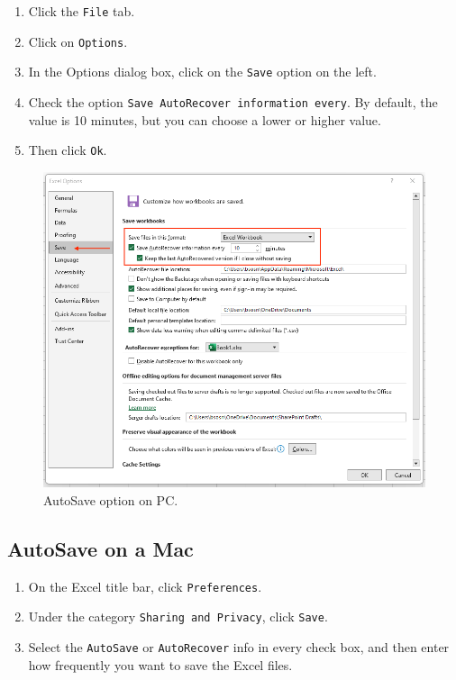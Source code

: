\documentclass[
]{book}
\providecommand{\tightlist}{%
  \setlength{\itemsep}{0pt}\setlength{\parskip}{0pt}}
\begin{document}
\begin{enumerate}
\def\labelenumi{\arabic{enumi}.}
\tightlist
\item
  Click the \texttt{File} tab.
\item
  Click on \texttt{Options}.
\item
  In the Options dialog box, click on the \texttt{Save} option on the left.
\item
  Check the option \texttt{Save\ AutoRecover\ information\ every}. By default, the value is 10 minutes, but you can choose a lower or higher value.
\item
  Then click \texttt{Ok}.
\end{enumerate}

\begin{figure}

{\centering \includegraphics[width=0.85\linewidth]{autosave-pc} 

}

\caption{AutoSave option on PC.}\label{fig:autosave-pc}
\end{figure}

\hypertarget{autosave-on-a-mac}{%
\subsection{AutoSave on a Mac}\label{autosave-on-a-mac}}

\begin{enumerate}
\def\labelenumi{\arabic{enumi}.}
\tightlist
\item
  On the Excel title bar, click \texttt{Preferences}.
\item
  Under the category \texttt{Sharing\ and\ Privacy}, click \texttt{Save}.
\item
  Select the \texttt{AutoSave} or \texttt{AutoRecover} info in every check box, and then enter how frequently you want to save the Excel files.
\end{enumerate}
\end{document}
